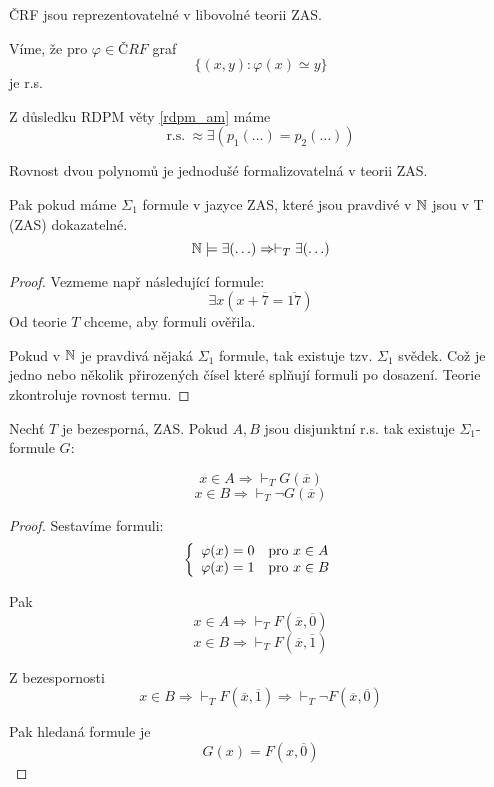 \begin{observation}
	ČRF jsou reprezentovatelné v libovolné teorii ZAS.

	Víme, že pro $\varphi \in ČRF$ graf
	\[ \{ (x, y): \varphi(x) \simeq y \} \]
	je r.s.

	Z důsledku RDPM věty \cref{rdpm_am} máme
	\[ \text{r.s.}\ \approx \exists(p_1(\ldots) = p_2(\ldots)) \]

	Rovnost dvou polynomů je jednodušé formalizovatelná v teorii ZAS.
\end{observation}

\begin{theorem}[Vztah $\N a\ T$]
	Pak pokud máme $\Sigma_1$ formule v jazyce ZAS, které jsou pravdivé v $\operatorname{\mathbb{N}}$ jsou v T (ZAS) dokazatelné.
	\[ \operatorname{\mathbb{N}} \models \exists (\ldots) \Rightarrow \vdash_T \exists (\ldots) \]
\end{theorem}
\begin{proof}
	Vezmeme např následující formule:
	\[ \exists x (x + \overline{7} = \overline{17})\]
	Od teorie $T$ chceme, aby formuli ověřila.

	Pokud v $\operatorname{\mathbb{N}}$ je pravdivá nějaká $\Sigma_1$ formule, tak existuje tzv. $\Sigma_1$ svědek.
	Což je jedno nebo několik přirozených čísel které splňují formuli po dosazení.
	Teorie zkontroluje rovnost termu.
\end{proof}

\begin{lemma}
	Nechť $T$ je bezesporná, ZAS.
	Pokud $A, B$ jsou disjunktní r.s. tak existuje $\Sigma_1$-formule $G$:

	\[ x \in A \Rightarrow \vdash_T G(\overline{x}) \]
	\[ x \in B \Rightarrow \vdash_T \neg G(\overline{x}) \]
\end{lemma}
\begin{proof}
	Sestavíme formuli:
	\[ \left\{ \begin{array}{ll} \varphi(x) = 0 & \mbox{pro } x \in A \\ \varphi(x) = 1 & \mbox{pro } x \in B \end{array} \right. \]

	Pak
	\[ x \in A \Rightarrow \vdash_T F(\overline{x}, \overline{0}) \]
	\[ x \in B \Rightarrow \vdash_T F(\overline{x}, \overline{1}) \]

	Z bezespornosti
	\[ x \in B \Rightarrow \vdash_T F(\overline{x}, \overline{1}) \Rightarrow \vdash_T \neg F(\overline{x}, \overline{0}) \]

	Pak hledaná formule je
	\[ G(x) = F(x, \overline{0}) \]
\end{proof}

